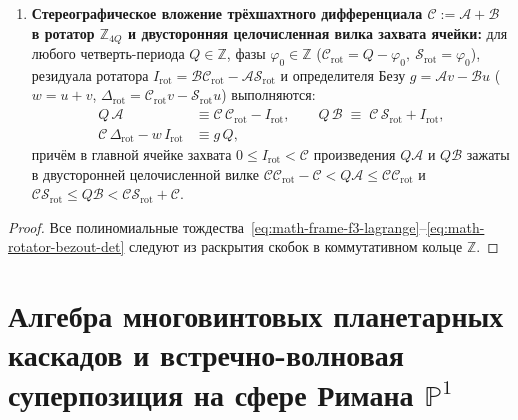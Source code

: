 \begin{theorem}
\begin{enumerate}[label=\textbf{(\arabic*)},leftmargin=*]
\begin{align}
  \end{align}
\item \textbf{Стереографическое вложение трёхшахтного дифференциала $\mathcal{C} := \mathcal{A} + \mathcal{B}$ в ротатор $\mathbb{Z}_{4Q}$ и двусторонняя целочисленная вилка захвата ячейки:}
  для любого четверть-периода $Q \in \mathbb{Z}$, фазы $\varphi_0 \in \mathbb{Z}$ ($\mathcal{C}_{\mathrm{rot}} = Q - \varphi_0,\ \mathcal{S}_{\mathrm{rot}} = \varphi_0$), резидуала ротатора $I_{\mathrm{rot}} = \mathcal{B}\mathcal{C}_{\mathrm{rot}} - \mathcal{A}\mathcal{S}_{\mathrm{rot}}$ и определителя Безу $g = \mathcal{A}v - \mathcal{B}u$ ($w = u + v$, $\Delta_{\mathrm{rot}} = \mathcal{C}_{\mathrm{rot}}v - \mathcal{S}_{\mathrm{rot}}u$) выполняются:
  \begin{align}
    Q\,\mathcal{A} &\equiv \mathcal{C}\,\mathcal{C}_{\mathrm{rot}} - I_{\mathrm{rot}}, \qquad
    Q\,\mathcal{B} \;\equiv\; \mathcal{C}\,\mathcal{S}_{\mathrm{rot}} + I_{\mathrm{rot}}, \label{eq:math-rotator-ab-split} \\
    \mathcal{C}\,\Delta_{\mathrm{rot}} - w\,I_{\mathrm{rot}} &\equiv g\,Q, \label{eq:math-rotator-bezout-det}
  \end{align}
  причём в главной ячейке захвата $0 \le I_{\mathrm{rot}} < \mathcal{C}$ произведения $Q\mathcal{A}$ и $Q\mathcal{B}$ зажаты в двусторонней целочисленной вилке $\mathcal{C}\mathcal{C}_{\mathrm{rot}} - \mathcal{C} < Q\mathcal{A} \le \mathcal{C}\mathcal{C}_{\mathrm{rot}}$ и $\mathcal{C}\mathcal{S}_{\mathrm{rot}} \le Q\mathcal{B} < \mathcal{C}\mathcal{S}_{\mathrm{rot}} + \mathcal{C}$.
\end{enumerate}
\end{theorem}

\begin{proof}
\leanok
Все полиномиальные тождества~\eqref{eq:math-frame-f3-lagrange}--\eqref{eq:math-rotator-bezout-det} следуют из раскрытия скобок в коммутативном кольце $\mathbb{Z}$.
\end{proof}

\chapter{Алгебра многовинтовых планетарных каскадов и встречно-волновая суперпозиция на сфере Римана \texorpdfstring{$\mathbb{P}^1$}{P1}}
\label{ch:math-multiscrew-and-holonomy}

